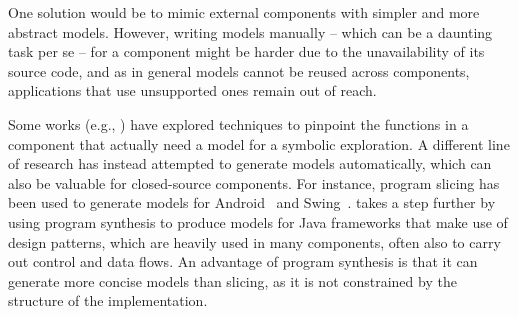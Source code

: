 {One solution would be to mimic external components with simpler and more abstract models. However, writing models manually -- which can be a daunting task per se -- for a component might be harder due to the unavailability of its source code,  and as in general models cannot be reused across components, applications that use unsupported ones remain out of reach. 

Some works (e.g., \cite{AOH-TACAS07,XXT-ICSE11}) have explored techniques to pinpoint the functions in a component that actually need a model for a symbolic exploration. A different line of research has instead attempted to generate models automatically, which can also be valuable for closed-source components. For instance, program slicing has been used to generate models for Android~\cite{VTV-SEN15} and Swing~\cite{CT-SEN14}. \cite{JQF-ICSE16} takes a step further by using program synthesis to produce models for Java frameworks that make use of design patterns, which are heavily used in many components, often also to carry out control and data flows. An advantage of program synthesis is that it can generate more concise models than slicing, as it is not constrained by the structure of the implementation. %


}